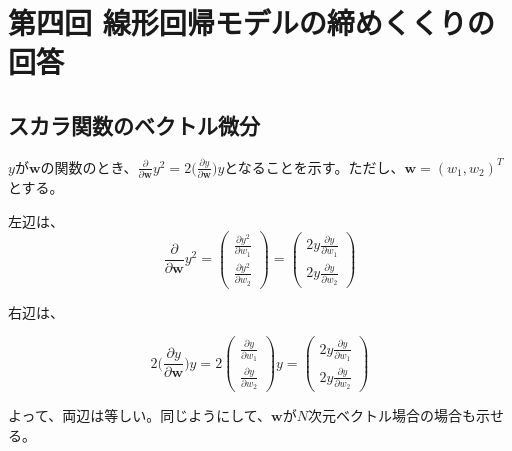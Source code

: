 \section*{第四回 線形回帰モデルの締めくくりの回答}

\subsection*{スカラ関数のベクトル微分}

$y$が$\mathbf{w}$の関数のとき、$\frac{\partial}{ \partial \mathbf{w}} y^2 = 2 \bigg( \frac{\partial y }{ \partial \mathbf{w} } \bigg)y$となることを示す。ただし、$\mathbf{w} = (w_1, w_2)^T$とする。

左辺は、
\begin{equation*}
\frac{\partial}{\partial \mathbf{w}} y^2 = \begin{pmatrix}
	\frac{\partial y^2}{\partial w_1} \\
	\frac{\partial y^2}{\partial w_2}   
\end{pmatrix} = \begin{pmatrix}
	2y\frac{\partial y}{\partial w_1} \\
	2y\frac{\partial y}{\partial w_2}   
\end{pmatrix}		
\end{equation*}

右辺は、

\begin{equation*}
2 \bigg( \frac{\partial y }{ \partial \mathbf{w} } \bigg)y =  
2\begin{pmatrix}
	\frac{\partial y}{\partial w_1} \\
	\frac{\partial y}{\partial w_2}   
\end{pmatrix}y = \begin{pmatrix}
	2y\frac{\partial y}{\partial w_1} \\
	2y\frac{\partial y}{\partial w_2}   
\end{pmatrix}		
\end{equation*}


よって、両辺は等しい。同じようにして、$\mathbf{w}$が$N$次元ベクトル場合の場合も示せる。